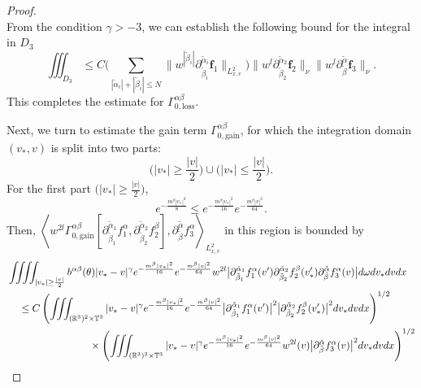 \documentclass[reqno]{amsart}
\numberwithin{equation}{section}
\numberwithin{equation}{section}
\begin{document}
\begin{proof}
$$		 $$
		 From the condition $\gamma > -3$, we can establish the following bound for the integral in $D_3$
		 \begin{equation*}
		 \iiint_{D_3} \leq C \Bigg( \sum_{|\tilde{\alpha}_i| + |\tilde{\beta}_i| \le N} \big\| w^{|\tilde{\beta}_i|}  \partial_{\tilde{\beta}_i}^{\tilde{\alpha}_i}\mathbf{f}_1  \big\|_{L^{2}_{x,v}} \Bigg) \big\| w^l \partial_{\tilde{\beta}_2}^{\tilde{\alpha}_2}\mathbf{f}_2 \big\|_{\nu} \big\| w^l \partial_{\tilde{\beta}}^{\tilde{\alpha}}\mathbf{f}_3 \big\|_{\nu}.
		\end{equation*}
		 This completes the estimate for  $\Gamma_{0,\text{loss}}^{\alpha \beta}$.
		 
		 Next, we turn to estimate the gain term $\Gamma_{0,\text{gain}}^{\alpha \beta}$, for which the integration domain $(v_*, v)$ is split into two parts:
		 $$
		 \big(|v_*| \ge \frac{|v|}{2}\big) \cup \big(|v_*| \le \frac{|v|}{2}\big).
		 $$
		 For the first part $\big(|v_*| \ge \frac{|v|}{2}\big)$,
		 \begin{equation*}
		 	e^{-\frac{m^{\beta}|v_*|^2}{8}} \leq e^{-\frac{m^{\beta}|v_*|^2}{16}}e^{-\frac{m^{\beta}|v|^2}{64}}.
		 \end{equation*}
		 Then,  $\left\langle w^{2l}\Gamma_{0,\text{gain}}^{\alpha \beta} [\partial_{\tilde{\beta}_1}^{\tilde{\alpha}_1}f^{\alpha}_1, \partial_{\tilde{\beta}_2}^{\tilde{\alpha}_2}f^{\beta}_2],  \partial_{\tilde{\beta}}^{\tilde{\alpha}}f^{\alpha}_3\right\rangle_{L_{x,v}^2}$ in this region is bounded by
		 $$
		 \begin{aligned}
		 	&\iiiint_{|v_*| \geq \frac{|v|}{2}} b^{\alpha\beta}(\theta)|v_* - v|^\gamma e^{-\frac{m^{\beta}|v_*|^2}{16}}e^{-\frac{m^{\beta}|v|^2}{64}} w^{2l} \big|\partial_{\tilde{\beta}_1}^{\tilde{\alpha}_1}f^{\alpha}_1 (v') \partial_{\tilde{\beta}_2}^{\tilde{\alpha}_2}f^{\beta}_2(v_*') \partial_{\tilde{\beta}}^{\tilde{\alpha}}f^{\alpha}_3 (v)\big| d\omega dv_*dvdx \\
		 	&\hspace{0.4cm}\leq C \left( \iiint_{(\mathbb{R}^3)^2\times\mathbb{T}^3} |v_* - v|^\gamma e^{-\frac{m^{\beta}|v_*|^2}{16}}e^{-\frac{m^{\beta}|v|^2}{64}} \big|\partial_{\tilde{\beta}_1}^{\tilde{\alpha}_1}f^{\alpha}_1 (v')\big|^2 \big|\partial_{\tilde{\beta}_2}^{\tilde{\alpha}_2}f^{\beta}_2(v_*')\big|^2 dv_*dvdx\right)^{1/2} \\
		 	&\hspace{2.5cm}\quad \times \left( \iiint_{(\mathbb{R}^3)^2\times\mathbb{T}^3} |v_* - v|^\gamma e^{-\frac{m^{\beta}|v_*|^2}{16}}e^{-\frac{m^{\beta}|v|^2}{64}} w^{2l}(v) \big|\partial_{\tilde{\beta}}^{\tilde{\alpha}}f^{\alpha}_3 (v)\big|^2 dv_*dvdx\right)^{1/2} \\

\end{aligned}$$
\end{proof}
\end{document}
